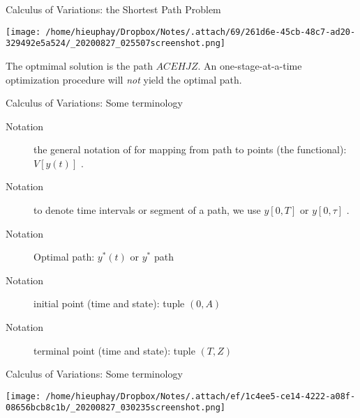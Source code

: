 \documentclass[10pt]{beamer}
\begin{document}
\begin{frame}[label={sec:org6918f72}]{Calculus of Variations: the Shortest Path Problem}
\begin{center}
\texttt{[image: /home/hieuphay/Dropbox/Notes/.attach/69/261d6e-45cb-48c7-ad20-329492e5a524/\_20200827\_025507screenshot.png]}
\end{center}

The optmimal solution is the path \(ACEHJZ\). An one-stage-at-a-time optimization procedure will \emph{not} yield the optimal path.
\end{frame}

\begin{frame}[label={sec:orga39f4e9}]{Calculus of Variations: Some terminology}
\begin{description}
\item[{Notation}] the general notation of for mapping from path to points (the \alert{functional}): \(V\left[y(t)\right]\) .
\item[{Notation}] to denote time intervals or segment of a path, we use \(y\left[0, T\right]\) or \(y\left[0, \tau\right]\) .
\item[{Notation}] Optimal path: \(y^{*}(t)\) or \(y^{*}\) path
\item[{Notation}] initial point (time and state): tuple \((0, A)\)
\item[{Notation}] terminal point (time and state): tuple \((T, Z)\)
\end{description}
\end{frame}

\begin{frame}[label={sec:orgd8c9eae}]{Calculus of Variations: Some terminology}
\begin{center}
\texttt{[image: /home/hieuphay/Dropbox/Notes/.attach/ef/1c4ee5-ce14-4222-a08f-08656bcb8c1b/\_20200827\_030235screenshot.png]}
\end{center}
\end{frame}
\end{document}
